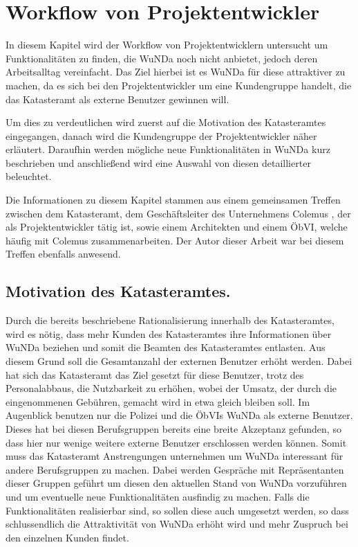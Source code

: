 \chapter{Workflow von Projektentwickler} \label{ch:aussicht}

In diesem Kapitel wird der Workflow von Projektentwicklern untersucht um Funktionalitäten zu finden, die \ac{WuNDa} noch nicht anbietet, jedoch deren Arbeitsalltag vereinfacht.
Das Ziel hierbei ist es \ac{WuNDa} für diese attraktiver zu machen, da es sich bei den Projektentwickler um eine Kundengruppe handelt, die das Katasteramt als externe Benutzer gewinnen will. 

Um dies zu verdeutlichen wird zuerst auf die Motivation des Katasteramtes eingegangen, danach wird die Kundengruppe der Projektentwickler näher erläutert.
Daraufhin werden mögliche neue Funktionalitäten in \ac{WuNDa} kurz beschrieben und anschließend wird eine Auswahl von diesen detaillierter beleuchtet.

Die Informationen zu diesem Kapitel stammen aus einem gemeinsamen Treffen zwischen dem Katasteramt, dem Geschäftsleiter des Unternehmens Colemus \autocite{colemus}, der als Projektentwickler tätig ist, sowie einem Architekten und einem \ac{ÖbVI}, welche häufig mit Colemus zusammenarbeiten. Der Autor dieser Arbeit war bei diesem Treffen ebenfalls anwesend.

\section{Motivation des Katasteramtes.}

Durch die bereits beschriebene Rationalisierung innerhalb des Katasteramtes, wird es nötig, dass mehr Kunden des Katasteramtes ihre Informationen über \ac{WuNDa} beziehen und somit die Beamten des Katasteramtes entlasten.
Aus diesem Grund soll die Gesamtanzahl der externen Benutzer erhöht werden.
Dabei hat sich das Katasteramt das Ziel gesetzt für diese Benutzer, trotz des Personalabbaus, die Nutzbarkeit zu erhöhen, wobei der Umsatz, der durch die eingenommenen Gebühren, gemacht wird in etwa gleich bleiben soll.
Im Augenblick benutzen nur die Polizei und die \acp{ÖbVI} \ac{WuNDa} als externe Benutzer.
Dieses hat bei diesen Berufsgruppen bereits eine breite Akzeptanz gefunden, so dass hier nur wenige weitere externe Benutzer erschlossen werden können.
Somit muss das Katasteramt Anstrengungen unternehmen um \ac{WuNDa} interessant für andere Berufsgruppen zu machen.
Dabei werden Gespräche mit Repräsentanten dieser Gruppen geführt um diesen den aktuellen Stand von \ac{WuNDa} vorzuführen und um eventuelle neue Funktionalitäten ausfindig zu machen.
Falls die Funktionalitäten realisierbar sind, so sollen diese auch umgesetzt werden, so dass schlussendlich die Attraktivität von \ac{WuNDa} erhöht wird und mehr Zuspruch bei den einzelnen Kunden findet.

